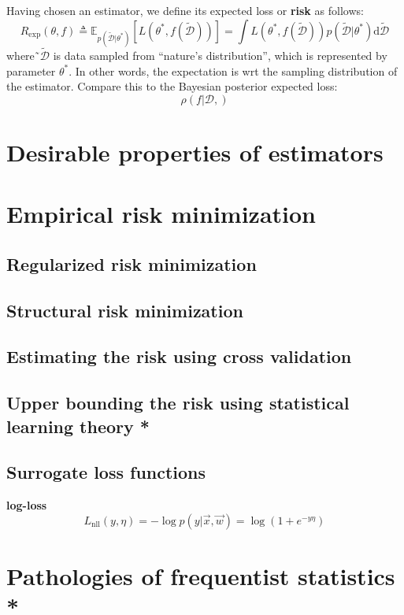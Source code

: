 Having chosen an estimator, we define its expected loss or \textbf{risk} as follows:
\begin{equation}
R_{\mathrm{exp}}(\theta,f) \triangleq \mathbb{E}_{p(\tilde{\mathcal{D}}|\theta^*)}[L(\theta^*, f(\tilde{\mathcal{D}}))]=\int L(\theta^*, f(\tilde{\mathcal{D}}))p(\tilde{\mathcal{D}}|\theta^*)\mathrm{d}\tilde{\mathcal{D}}
\end{equation}
where˜$\tilde{\mathcal{D}}$ is data sampled from “nature’s distribution”, which is represented by parameter $\theta^*$. In other words, the expectation is wrt the sampling distribution of the estimator. Compare this to the Bayesian posterior expected loss:
\begin{equation}
\rho(f|\mathcal{D},)
\end{equation}


\section{Desirable properties of estimators}


\section{Empirical risk minimization}


\subsection{Regularized risk minimization}


\subsection{Structural risk minimization}


\subsection{Estimating the risk using cross validation}


\subsection{Upper bounding the risk using statistical learning theory *}


\subsection{Surrogate loss functions}
\label{sec:Surrogate-loss-functions}

\textbf{log-loss}
\begin{equation}\label{eqn:log-loss}
L_{\mathrm{nll}}(y,\eta)=-\log p(y|\vec{x},\vec{w})=\log(1+e^{-y\eta})
\end{equation}


\section{Pathologies of frequentist statistics *}

